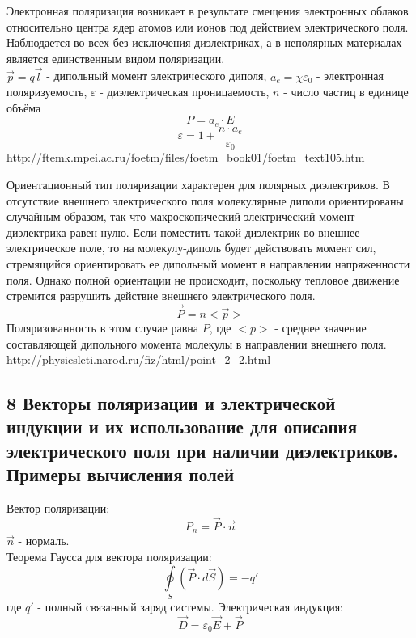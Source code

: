 \documentclass[a4paper,12pt]{article}
\begin{document}
Электронная поляризация возникает в результате смещения электронных облаков относительно центра ядер атомов или ионов под действием электрического поля. Наблюдается во всех без исключения диэлектриках, а в неполярных материалах является единственным видом поляризации.\\
$\vec{p} = q\vec{l}$ - дипольный момент электрического диполя, $a_e = \chi \varepsilon_0$ - электронная поляризуемость, $\varepsilon$ - диэлектрическая проницаемость, $n$ - число частиц в единице объёма\\
\begin{equation}
	P = a_e \cdot E
\end{equation}
\begin{equation}
	\varepsilon = 1 + \frac{n \cdot a_e}{\varepsilon _0}
\end{equation}
\url{http://ftemk.mpei.ac.ru/foetm/files/foetm_book01/foetm_text105.htm}

Ориентационный тип поляризации характерен для полярных диэлектриков. В отсутствие внешнего электрического поля молекулярные диполи ориентированы случайным образом, так что макроскопический электрический момент диэлектрика равен нулю. Если поместить такой диэлектрик во внешнее электрическое поле, то на молекулу-диполь будет действовать момент сил, стремящийся ориентировать ее дипольный момент в направлении напряженности поля. Однако полной ориентации не происходит, поскольку тепловое движение стремится разрушить действие внешнего электрического поля.\\
\begin{equation}
	\vec{P} = n <\vec{p}>
\end{equation}
Поляризованность в этом случае равна $P$, где $<p>$ - среднее значение составляющей дипольного момента молекулы в направлении внешнего поля.\\
\url{http://physicsleti.narod.ru/fiz/html/point_2_2.html}

\subsection{8   Векторы поляризации и электрической индукции и их использование для описания электрического поля при наличии диэлектриков. Примеры вычисления полей}
Вектор поляризации:\\
\begin{equation}
	P_n = \vec{P} \cdot \vec{n}
\end{equation}
$\vec{n}$ - нормаль.\\
Теорема Гаусса для вектора поляризации:
\begin{equation}
	\oint\limits_S {(\vec{P} \cdot d \vec{S})} = -q'
\end{equation}
где $ q' $ - полный связанный заряд системы.
Электрическая индукция:\\
\begin{equation}
	\vec{D} = \varepsilon _0 \vec{E} + \vec{P}
\end{equation}
\end{document}

